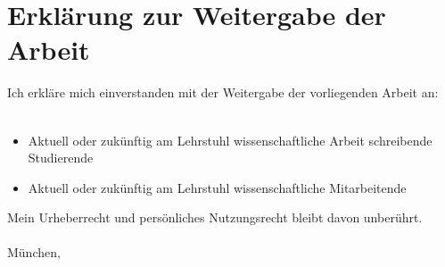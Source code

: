 
\chapter*{Erklärung zur Weitergabe der Arbeit}

Ich erkläre mich einverstanden mit der Weitergabe der vorliegenden Arbeit an:\\
\\
\begin{itemize}
	\item Aktuell oder zukünftig am Lehrstuhl wissenschaftliche Arbeit schreibende Studierende
	\item 	Aktuell oder zukünftig am Lehrstuhl wissenschaftliche Mitarbeitende
\end{itemize}

Mein Urheberrecht und persönliches Nutzungsrecht bleibt davon unberührt.
\\
\vspace*{2cm}\\
München, \dateosub \hspace{0.5cm} \makebox[1.5in]{\hrulefill}